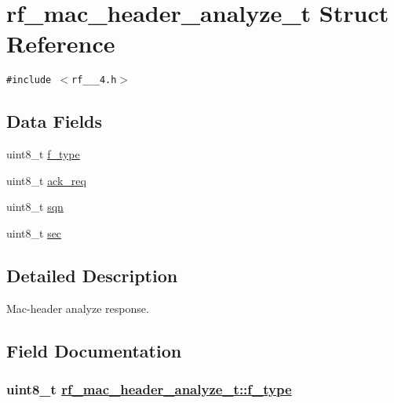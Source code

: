 \hypertarget{structrf__mac__header__analyze__t}{
\section{rf\_\-mac\_\-header\_\-analyze\_\-t Struct Reference}
\label{structrf__mac__header__analyze__t}
}
{\tt \#include $<$rf\_\_\_\-4.h$>$}

\subsection*{Data Fields}
\begin{CompactItemize}
\item 
uint8\_\-t \hyperlink{structrf__mac__header__analyze__t_cdea55dd9662076c530db418e501a4b3}{f\_\-type}
\item 
uint8\_\-t \hyperlink{structrf__mac__header__analyze__t_4fe82df93230eef5db2a4f335f726e52}{ack\_\-req}
\item 
uint8\_\-t \hyperlink{structrf__mac__header__analyze__t_9697d7e7a2305dccac3af80253c02894}{sqn}
\item 
uint8\_\-t \hyperlink{structrf__mac__header__analyze__t_101f756d24f219d91e70d6f2f402e0d3}{sec}
\end{CompactItemize}


\subsection{Detailed Description}
Mac-header analyze response. 



\subsection{Field Documentation}
\hypertarget{structrf__mac__header__analyze__t_cdea55dd9662076c530db418e501a4b3}{
\subsubsection[f\_\-type]{\setlength{\rightskip}{0pt plus 5cm}uint8\_\-t \hyperlink{structrf__mac__header__analyze__t_cdea55dd9662076c530db418e501a4b3}{rf\_\-mac\_\-header\_\-analyze\_\-t::f\_\-type}}}
\label{structrf__mac__header__analyze__t_cdea55dd9662076c530db418e501a4b3}


